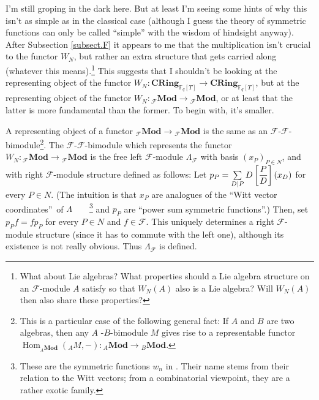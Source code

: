 \documentclass[numbers=enddot,12pt,final,onecolumn,notitlepage]{scrartcl}%
\theoremstyle{definition}
\let\sumnonlimits\sum
\renewcommand{\sum}{\sumnonlimits\limits}
\begin{document}
I'm still groping in the dark here. But at least I'm seeing some hints of why
this isn't as simple as in the classical case (although I guess the theory of
symmetric functions can only be called ``simple'' with the wisdom of hindsight
anyway). After Subsection \ref{subsect.F} it appears to me that the
multiplication isn't crucial to the functor $W_{N}$, but rather an extra
structure that gets carried along (whatever this means).\footnote{What about
Lie algebras? What properties should a Lie algebra structure on an
$\mathcal{F}$-module $A$ satisfy so that $W_{N}\left(  A\right)  $ also is a
Lie algebra? Will $W_{N}\left(  A\right)  $ then also share these properties?}
This suggests that I shouldn't be looking at the representing object of the
functor $W_{N}:\mathbf{CRing}_{\mathbb{F}_{q}\left[  T\right]  }%
\rightarrow\mathbf{CRing}_{\mathbb{F}_{q}\left[  T\right]  }$, but at the
representing object of the functor $W_{N}:\left.  _{\mathcal{F}}%
\mathbf{Mod}\right.  \rightarrow\left.  _{\mathcal{F}}\mathbf{Mod}\right.  $,
or at least that the latter is more fundamental than the former. To begin
with, it's smaller.

A representing object of a functor $\left.  _{\mathcal{F}}\mathbf{Mod}\right.
\rightarrow\left.  _{\mathcal{F}}\mathbf{Mod}\right.  $ is the same as an
$\mathcal{F}$-$\mathcal{F}$-bimodule\footnote{This is a particular case of the
following general fact: If $A$ and $B$ are two algebras, then any $A$%
-$B$-bimodule $M$ gives rise to a representable functor $\operatorname*{Hom}%
\nolimits_{_{A}\mathbf{Mod}}\left(  _{A}M,-\right)  :\left.  _{A}%
\mathbf{Mod}\right.  \rightarrow\left.  _{B}\mathbf{Mod}\right.  $.}. The
$\mathcal{F}$-$\mathcal{F}$-bimodule which represents the functor
$W_{N}:\left.  _{\mathcal{F}}\mathbf{Mod}\right.  \rightarrow\left.
_{\mathcal{F}}\mathbf{Mod}\right.  $ is the free left $\mathcal{F}$-module
$\Lambda_{\mathcal{F}}$ with basis $\left(  x_{P}\right)  _{P\in N}$, and with
right $\mathcal{F}$-module structure defined as follows: Let $p_{P}%
=\sum\limits_{D\mid P}D\left[  \dfrac{P}{D}\right]  \left(  x_{D}\right)  $
for every $P\in N$. (The intuition is that $x_{P}$ are analogues of the
\textquotedblleft Witt vector coordinates\textquotedblright\ of $\Lambda
$\ \ \ \ \footnote{These are the symmetric functions $w_{n}$ in \cite[Exercise
2.80]{reiner-hopf}. Their name stems from their relation to the Witt vectors;
from a combinatorial viewpoint, they are a rather exotic family.} and $p_{P}$
are \textquotedblleft power sum symmetric functions\textquotedblright.) Then,
set $p_{P}f=fp_{P}$ for every $P\in N$ and $f\in\mathcal{F}$. This uniquely
determines a right $\mathcal{F}$-module structure (since it has to commute
with the left one), although its existence is not really obvious. Thus
$\Lambda_{\mathcal{F}}$ is defined.
\end{document}

